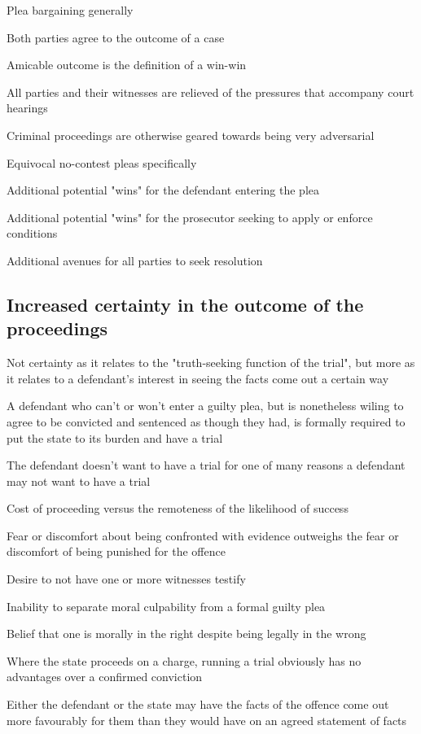 Plea bargaining generally

Both parties agree to the outcome of a case

Amicable outcome is the definition of a win-win

All parties and their witnesses are relieved of the pressures that accompany court hearings

Criminal proceedings are otherwise geared towards being very adversarial

Equivocal no-contest pleas specifically

Additional potential "wins" for the defendant entering the plea

Additional potential "wins" for the prosecutor seeking to apply or enforce conditions

Additional avenues for all parties to seek resolution

\subsection{Increased certainty in the outcome of the proceedings}

Not certainty as it relates to the "truth-seeking function of the trial", but more as it relates to a defendant's interest in seeing the facts come out a certain way

A defendant who can't or won't enter a guilty plea, but is nonetheless wiling to agree to be convicted and sentenced as though they had, is formally required to put the state to its burden and have a trial

The defendant doesn't want to have a trial for one of many reasons a defendant may not want to have a trial

Cost of proceeding versus the remoteness of the likelihood of success

Fear or discomfort about being confronted with evidence outweighs the fear or discomfort of being punished for the offence

Desire to not have one or more witnesses testify

Inability to separate moral culpability from a formal guilty plea

Belief that one is morally in the right despite being legally in the wrong

Where the state proceeds on a charge, running a trial obviously has no advantages over a confirmed conviction

Either the defendant or the state may have the facts of the offence come out more favourably for them than they would have on an agreed statement of facts

